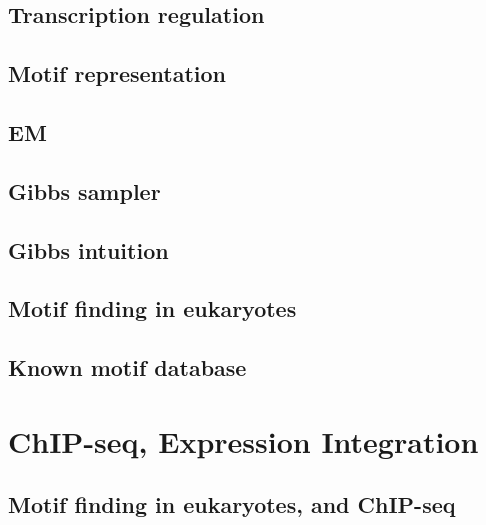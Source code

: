 \documentclass[
]{book}
\begin{document}
\hypertarget{transcription-regulation}{%
\section{Transcription regulation}\label{transcription-regulation}}

\hypertarget{motif-representation}{%
\section{Motif representation}\label{motif-representation}}

\hypertarget{em}{%
\section{EM}\label{em}}

\hypertarget{gibbs-sampler}{%
\section{Gibbs sampler}\label{gibbs-sampler}}

\hypertarget{gibbs-intuition}{%
\section{Gibbs intuition}\label{gibbs-intuition}}

\hypertarget{motif-finding-in-eukaryotes}{%
\section{Motif finding in eukaryotes}\label{motif-finding-in-eukaryotes}}

\hypertarget{known-motif-database}{%
\section{Known motif database}\label{known-motif-database}}

\hypertarget{chip}{%
\chapter{ChIP-seq, Expression Integration}\label{chip}}

\hypertarget{motif-finding-in-eukaryotes-and-chip-seq}{%
\section{Motif finding in eukaryotes, and ChIP-seq}\label{motif-finding-in-eukaryotes-and-chip-seq}}
\end{document}
